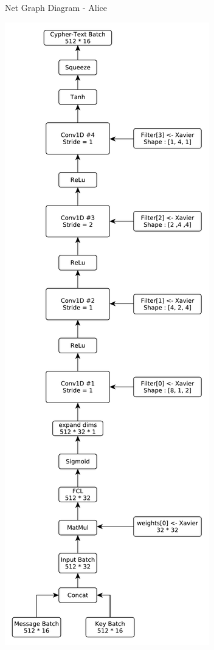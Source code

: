 \documentclass[12pt]{article}
\begin{document}
\begin{blockfigure}{ Net Graph Diagram - Alice}
	\begin{center}
		\includegraphics[height=0.93\textheight]{Alice-Diagram}
	\end{center}
\end{blockfigure}
\end{document}
